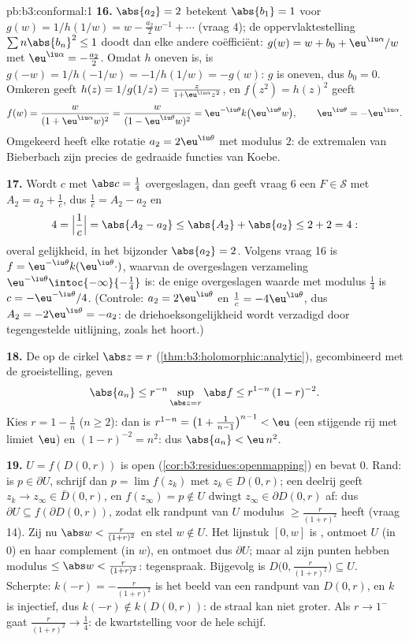 \begin{solution}{pb:b3:conformal:1}
\textbf{16.} $\abs{a_2} = 2$ betekent $\abs{b_1} = 1$ voor $g(w)
= 1/h(1/w) = w - \frac{a_2}2w^{-1} + \cdots$ (vraag 4); de
oppervlaktestelling $\sum n\abs{b_n}^2 \leq 1$ doodt dan elke
andere coëfficiënt: $g(w) = w + b_0 + \eu^{\iu\alpha}/w$ met
$\eu^{\iu\alpha} = -\frac{a_2}2$. Omdat $h$ oneven is, is $g(-w)
= 1/h(-1/w) = -1/h(1/w) = -g(w)$: $g$ is oneven, dus $b_0 = 0$.
Omkeren geeft $h(z) = 1/g(1/z) = \frac{z}{1 +
\eu^{\iu\alpha}z^2}$, en $f(z^2) = h(z)^2$ geeft
\[
f(w) = \frac{w}{(1 + \eu^{\iu\alpha}w)^2}
= \frac{w}{(1 - \eu^{\iu\theta}w)^2}
= \eu^{-\iu\theta}k\bigl(\eu^{\iu\theta}w\bigr),
\qquad \eu^{\iu\theta} = -\eu^{\iu\alpha} .
\]
Omgekeerd heeft elke rotatie $a_2 = 2\eu^{\iu\theta}$ met modulus
$2$: de extremalen van Bieberbach zijn precies de gedraaide
functies van Koebe.

\textbf{17.} Wordt $c$ met $\abs c = \frac14$ overgeslagen, dan
geeft vraag 6 een $F \in \mathcal S$ met $A_2 = a_2 + \frac1c$,
dus $\frac1c = A_2 - a_2$ en
\[
4 = \Bigl|\frac1c\Bigr| = \abs{A_2 - a_2}
\leq \abs{A_2} + \abs{a_2} \leq 2 + 2 = 4 :
\]
overal gelijkheid, in het bijzonder $\abs{a_2} = 2$. Volgens
vraag 16 is $f = \eu^{-\iu\theta}k(\eu^{\iu\theta}\cdot)$,
waarvan de overgeslagen verzameling $\eu^{-\iu\theta}
\intoc{-\infty}{-\frac14}$ is: de enige overgeslagen waarde met
modulus $\frac14$ is $c = -\eu^{-\iu\theta}/4$. (Controle: $a_2 =
2\eu^{\iu\theta}$ en $\frac1c = -4\eu^{\iu\theta}$, dus $A_2 =
-2\eu^{\iu\theta} = -a_2$: de driehoeksongelijkheid wordt
verzadigd door tegengestelde uitlijning, zoals het hoort.)

\textbf{18.} De  op de cirkel $\abs z =
r$ (\cref{thm:b3:holomorphic:analytic}), gecombineerd met de
groeistelling, geven
\[
\abs{a_n} \leq r^{-n}\sup_{\abs z = r}\abs f
\leq r^{1-n}\,(1 - r)^{-2} .
\] Kies $r = 1 - \frac1n$ ($n \geq 2$): dan is $r^{1-n} =
\bigl(1 + \frac1{n-1}\bigr)^{n-1} < \eu$ (een stijgende rij met
limiet $\eu$) en $(1 - r)^{-2} = n^2$: dus $\abs{a_n} < \eu\,n^2$.

\textbf{19.} $U = f(D(0, r))$ is open
(\cref{cor:b3:residues:openmapping}) en bevat $0$. Rand: is $p
\in \partial U$, schrijf dan $p = \lim f(z_k)$ met $z_k \in D(0,
r)$; een deelrij geeft $z_k \to z_\infty \in \bar D(0, r)$, en
$f(z_\infty) = p \notin U$ dwingt $z_\infty \in \partial D(0, r)$
af: dus $\partial U \subseteq f(\partial D(0, r))$, zodat elk
randpunt van $U$ modulus $\geq \frac r{(1+r)^2}$ heeft (vraag
14). Zij nu $\abs w < \frac r{(1+r)^2}$ en stel $w \notin U$. Het
lijnstuk $[0, w]$ is , ontmoet $U$ (in $0$) en haar
complement (in $w$), en ontmoet dus $\partial U$; maar al zijn
punten hebben modulus $\leq \abs w < \frac r{(1+r)^2}$:
tegenspraak. Bijgevolg is $D\bigl(0, \frac r{(1+r)^2}\bigr)
\subseteq U$. Scherpte: $k(-r) = -\frac r{(1+r)^2}$ is het beeld
van een randpunt van $D(0,r)$, en $k$ is injectief, dus $k(-r)
\notin k(D(0, r))$: de straal kan niet groter. Als $r \to 1^-$
gaat $\frac r{(1+r)^2} \to \frac14$: de kwartstelling voor de
hele schijf.


\end{solution}
